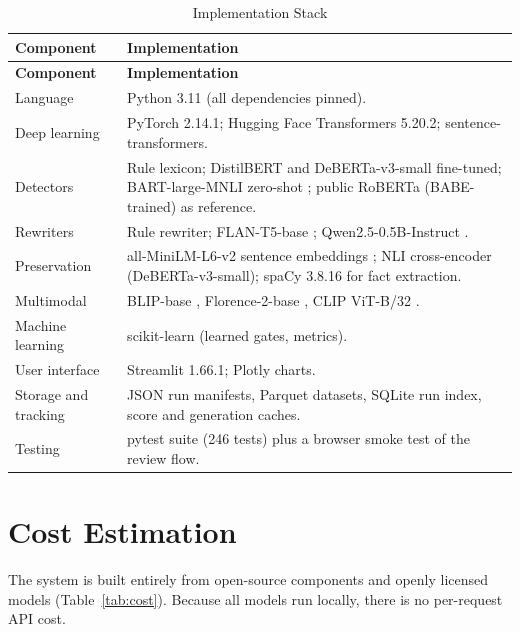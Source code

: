 \documentclass[12pt,a4paper,oneside]{report}
\begin{document}
\begin{longtable}{|L{3.6cm}|L{10.6cm}|}
\caption{Implementation Stack}\label{tab:sw}\\
\hline
\textbf{Component} & \textbf{Implementation}\\ \hline\endfirsthead
\hline \textbf{Component} & \textbf{Implementation}\\ \hline\endhead
Language & Python 3.11 (all dependencies pinned).\\ \hline
Deep learning & PyTorch 2.14.1; Hugging Face Transformers 5.20.2; sentence-transformers.\\ \hline
Detectors & Rule lexicon; DistilBERT \cite{distilbert} and DeBERTa-v3-small \cite{debertav3} fine-tuned; BART-large-MNLI
\cite{bart} zero-shot \cite{yin}; public RoBERTa (BABE-trained) as reference.\\ \hline
Rewriters & Rule rewriter; FLAN-T5-base \cite{flant5}; Qwen2.5-0.5B-Instruct \cite{qwen}.\\ \hline
Preservation & all-MiniLM-L6-v2 sentence embeddings \cite{sbert,minilm}; NLI cross-encoder (DeBERTa-v3-small); spaCy
3.8.16 for fact extraction.\\ \hline
Multimodal & BLIP-base \cite{blip}, Florence-2-base \cite{florence}, CLIP ViT-B/32 \cite{clip}.\\ \hline
Machine learning & scikit-learn (learned gates, metrics).\\ \hline
User interface & Streamlit 1.66.1; Plotly charts.\\ \hline
Storage and tracking & JSON run manifests, Parquet datasets, SQLite run index, score and generation caches.\\ \hline
Testing & pytest suite (246 tests) plus a browser smoke test of the review flow.\\ \hline
\end{longtable}

\section{Cost Estimation}
The system is built entirely from open-source components and openly licensed models (Table~\ref{tab:cost}). Because
all models run locally, there is no per-request API cost.
\end{document}
